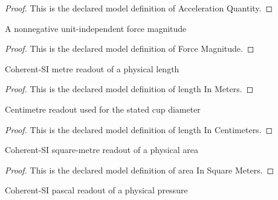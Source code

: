 \begin{proof}
  This is the declared model definition of Acceleration Quantity.
\end{proof}
\begin{definition}
  \label{def:physics:phyx-mini-0720:phyxminiproblems-problemphyxmini0720-forcemagnitude}
  A nonnegative unit-independent force magnitude
\end{definition}
\begin{proof}
  This is the declared model definition of Force Magnitude.
\end{proof}
\begin{definition}
  \label{def:physics:phyx-mini-0720:phyxminiproblems-problemphyxmini0720-lengthinmeters}
  Coherent-SI metre readout of a physical length
\end{definition}
\begin{proof}
  This is the declared model definition of length In Meters.
\end{proof}
\begin{definition}
  \label{def:physics:phyx-mini-0720:phyxminiproblems-problemphyxmini0720-lengthincentimeters}
  Centimetre readout used for the stated cup diameter
\end{definition}
\begin{proof}
  This is the declared model definition of length In Centimeters.
\end{proof}
\begin{definition}
  \label{def:physics:phyx-mini-0720:phyxminiproblems-problemphyxmini0720-areainsquaremeters}
  Coherent-SI square-metre readout of a physical area
\end{definition}
\begin{proof}
  This is the declared model definition of area In Square Meters.
\end{proof}
\begin{definition}
  \label{def:physics:phyx-mini-0720:phyxminiproblems-problemphyxmini0720-pressureinpascals}
  Coherent-SI pascal readout of a physical pressure
\end{definition}
